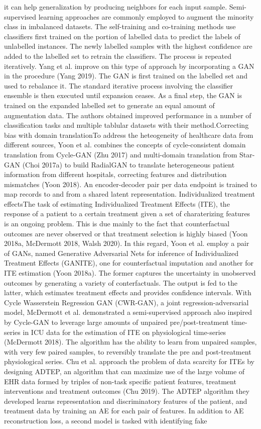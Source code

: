it can help generalization by producing neighbors for each input sample. Semi-supervised learning approaches are commonly employed to augment the minority class in imbalanced datasets. The self-training and co-training methods use classifiers first trained on the portion of labelled data to predict the labels of unlabelled instances. The newly labelled samples with the highest confidence are added to the labelled set to retrain the classifiers. The process is repeated iteratively. Yang et al. improve on this type of approach by incorporating a GAN in the procedure (Yang 2019). The GAN is first trained on the labelled set and used to rebalance it. The standard iterative process involving the classifier ensemble is then executed until expansion ceases. As a final step, the GAN is trained on the expanded labelled set to generate an equal amount of augmentation data. The authors obtained improved performance in a number of classification tasks and multiple tablular datasets with their method.Correcting bias with domain translationTo address the heteogeneity of healthcare data from different sources, Yoon et al. combines the concepts of cycle-consistent domain translation from Cycle-GAN (Zhu 2017) and multi-domain translation from Star-GAN (Choi 2017a) to build RadialGAN to translate heterogeneous patient information from different hospitals, correcting features and distribution mismatches (Yoon 2018). An encoder-decoder pair per data endpoint is trained to map records to and from a shared latent representation. Individualized treatment effectsThe task of estimating Individualized Treatment Effects (ITE), the response of a patient to a certain treatment given a set of charaterizing features is an ongoing problem. This is due mainly to the fact that counterfactual outcomes are never observed or that treatment selection is highly biased (Yoon 2018a, McDermott 2018, Walsh 2020). In this regard, Yoon et al. employ a pair of GANs, named Generative Adversarial Nets for inference of Individualized Treatment Effects (GANITE), one for counterfactual imputation and another for ITE estimation (Yoon 2018a). The former captures the uncertainty in unobserved outcomes by generating a variety of conterfactuals. The output is fed to the latter, which estimates treatment effects and provides confidence intervals. With Cycle Wasserstein Regression GAN (CWR-GAN), a joint regression-adversarial model, McDermott et al. demonstrated a semi-supervised approach also inspired by Cycle-GAN to leverage large amounts of unpaired pre/post-treatment time-series in ICU data for the estimation of ITE on physiological time-series (McDermott 2018). The algorithm has the ability to learn from unpaired samples, with very few paired samples, to reversibly translate the pre and post-treatment physiological series. Chu et al. approach the problem of data scarcity for ITEs by designing ADTEP, an algorithm that can maximize use of the large volume of EHR data formed by triples of non-task specific patient features, treatment interventions and treatment outcomes (Chu 2019). The ADTEP algorithm they developed learns representation and discriminatory features of the patient, and treatment data by training an AE for each pair of features. In addition to AE reconstruction loss, a second model is tasked with identifying fake 